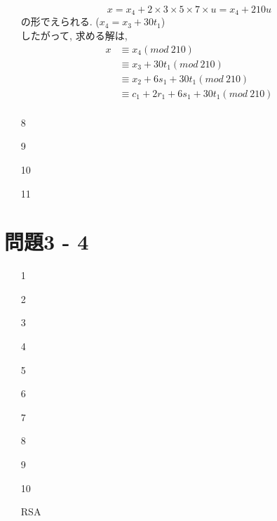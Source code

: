 \documentclass[12pt,a4paper]{jsarticle}
\begin{document}
\begin{enumerate}
 \[ x = x_4 + 2 \times 3 \times 5 \times 7 \times u = x_4 + 210u \] 
 の形でえられる. ($x_4 = x_3 + 30t_1$) \\
 したがって, 求める解は,
 \begin{align*}
 x
 &\equiv x_4 (mod~210)\\
 &\equiv x_3 + 30t_1 (mod~210) \\
 &\equiv x_2 + 6s_1 + 30t_1 (mod~210) \\
 &\equiv c_1 + 2r_1 + 6s_1 + 30t_1 (mod~210) \\
 \end{align*}
 \item[8]  \mbox{} \\
 \item[9]  \mbox{} \\
 \item[10]  \mbox{} \\
 \item[11]  \mbox{} \\
\end{enumerate}
\pagebreak

\section*{問題3 - 4}
\begin{enumerate}
 \item[1]  \mbox{} \\
 \item[2]  \mbox{} \\
 \item[3]  \mbox{} \\
 \item[4]  \mbox{} \\
 \item[5]  \mbox{} \\
 \item[6]  \mbox{} \\
 \item[7]  \mbox{} \\
 \item[8]  \mbox{} \\
 \item[9]  \mbox{} \\
 \item[10]  \mbox{} \\
 \item[RSA]  \mbox{} \\
\end{enumerate}
\pagebreak
\end{document}
